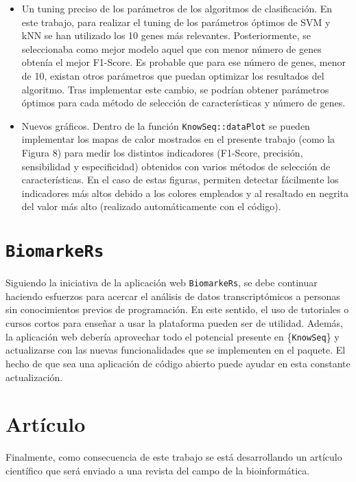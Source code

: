\begin{itemize}
	\item Un tuning preciso de los parámetros de los algoritmos de clasificación. En este trabajo, para realizar el tuning de los parámetros óptimos de SVM y kNN se han utilizado los 10 genes más relevantes. Posteriormente, se seleccionaba como mejor modelo aquel que con menor número de genes obtenía el mejor F1-Score. Es probable que para ese número de genes, menor de 10, existan otros parámetros que puedan optimizar los resultados del algoritmo. Tras implementar este cambio, se podrían obtener parámetros óptimos para cada método de selección de características y número de genes.
	\item Nuevos gráficos. Dentro de la función \texttt{KnowSeq::dataPlot} se pueden implementar los mapas de calor mostrados en el presente trabajo (como la Figura 8) para medir los distintos indicadores (F1-Score, precisión, sensibilidad y especificidad) obtenidos con varios métodos de selección de características. En el caso de estas figuras, permiten detectar fácilmente los indicadores más altos debido a los colores empleados y al resaltado en negrita del valor más alto (realizado automáticamente con el código).
\end{itemize}

\section{\texttt{BiomarkeRs}}

Siguiendo la iniciativa de la aplicación web \texttt{BiomarkeRs}, se debe continuar haciendo esfuerzos para acercar el análisis de datos transcriptómicos a personas sin conocimientos previos de programación. En este sentido, el uso de tutoriales o cursos cortos para enseñar a usar la plataforma pueden ser de utilidad. Además, la aplicación web debería aprovechar todo el potencial presente en \{\texttt{KnowSeq}\} y actualizarse con las nuevas funcionalidades que se implementen en el paquete. El hecho de que sea una aplicación de código abierto puede ayudar en esta constante actualización. 

\section{Artículo}

Finalmente, como consecuencia de este trabajo se está desarrollando un artículo científico que será enviado a una revista del campo de la bioinformática.